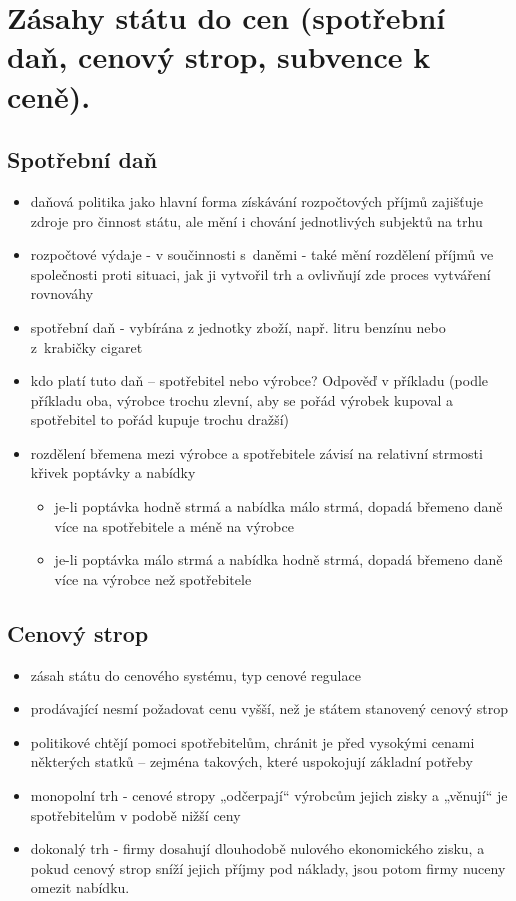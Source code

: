 \clearpage
\section{Zásahy státu do cen (spotřební daň, cenový strop, subvence k ceně).}

\subsection{Spotřební daň}
\begin{itemize}
    \item daňová politika jako hlavní forma získávání rozpočtových příjmů zajišťuje zdroje 
    pro činnost státu, ale mění i chování jednotlivých subjektů na trhu
    \item rozpočtové výdaje - v součinnosti s~daněmi - také mění rozdělení příjmů ve společnosti 
    proti situaci, jak ji vytvořil trh a ovlivňují zde proces vytváření rovnováhy
    \item spotřební daň - vybírána z jednotky zboží, např. litru benzínu nebo z~krabičky cigaret
    \item kdo platí tuto daň – spotřebitel nebo výrobce? Odpověď v příkladu (podle příkladu oba, 
    výrobce trochu zlevní, aby se pořád výrobek kupoval a spotřebitel to pořád kupuje trochu dražší)
    \item rozdělení břemena mezi výrobce a spotřebitele závisí na relativní strmosti křivek poptávky a nabídky
    \begin{itemize}
        \item je-li poptávka hodně strmá a nabídka málo strmá, dopadá břemeno daně více na spotřebitele a méně na výrobce
        \item je-li poptávka málo strmá a nabídka hodně strmá, dopadá břemeno daně více na výrobce než spotřebitele
    \end{itemize}
\end{itemize}

\subsection{Cenový strop}
\begin{itemize}
    \item zásah státu do cenového systému, typ cenové regulace
    \item prodávající nesmí požadovat cenu vyšší, než je státem stanovený cenový strop
    \item politikové chtějí pomoci spotřebitelům, chránit je před vysokými cenami některých
    statků – zejména takových, které uspokojují základní potřeby
    \item monopolní trh - cenové stropy „odčerpají“ výrobcům jejich zisky a „věnují“ je spotřebitelům v podobě nižší ceny
    \item dokonalý trh - firmy dosahují dlouhodobě nulového ekonomického zisku, a pokud cenový strop sníží
    jejich příjmy pod náklady, jsou potom firmy nuceny omezit nabídku.
\end{itemize}


